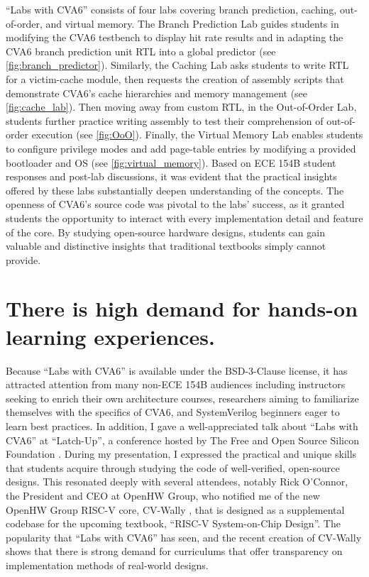 \enquote{Labs with CVA6} consists of four labs covering branch prediction, caching, out-of-order, and virtual memory. The Branch Prediction Lab guides students in modifying the CVA6 testbench to display hit rate results and in adapting the CVA6 branch prediction unit RTL into a global predictor (see \autoref{fig:branch_predictor}). Similarly, the Caching Lab asks students to write RTL for a victim-cache module, then requests the creation of assembly scripts that demonstrate CVA6's cache hierarchies and memory management (see \autoref{fig:cache_lab}). Then moving away from custom RTL, in the Out-of-Order Lab, students further practice writing assembly to test their comprehension of out-of-order execution (see \autoref{fig:OoO}). Finally, the Virtual Memory Lab enables students to configure privilege modes and add page-table entries by modifying a provided bootloader and OS (see \autoref{fig:virtual_memory}). Based on ECE 154B student responses and post-lab discussions, it was evident that the practical insights offered by these labs substantially deepen understanding of the concepts. The openness of CVA6's source code was pivotal to the labs' success, as it granted students the opportunity to interact with every implementation detail and feature of the core. By studying open-source hardware designs, students can gain valuable and distinctive insights that traditional textbooks simply cannot provide.

\FloatBarrier

\section{There is high demand for hands-on learning experiences.}

Because \enquote{Labs with CVA6} is available under the BSD-3-Clause license, it has attracted attention from many non-ECE 154B audiences including instructors seeking to enrich their own architecture courses, researchers aiming to familiarize themselves with the specifics of CVA6, and SystemVerilog beginners eager to learn best practices. In addition, I gave a well-appreciated talk about \enquote{Labs with CVA6} at \enquote{Latch-Up}, a conference hosted by The Free and Open Source Silicon Foundation \cite{SiffermanLatchUp}. During my presentation, I expressed the practical and unique skills that students acquire through studying the code of well-verified, open-source designs. This resonated deeply with several attendees, notably Rick O'Connor, the President and CEO at OpenHW Group, who notified me of the new OpenHW Group RISC-V core, CV-Wally \cite{cvwally}, that is designed as a supplemental codebase for the upcoming textbook, \enquote{RISC-V System-on-Chip Design}. The popularity that \enquote{Labs with CVA6} has seen, and the recent creation of CV-Wally shows that there is strong demand for curriculums that offer transparency on implementation methods of real-world designs.
